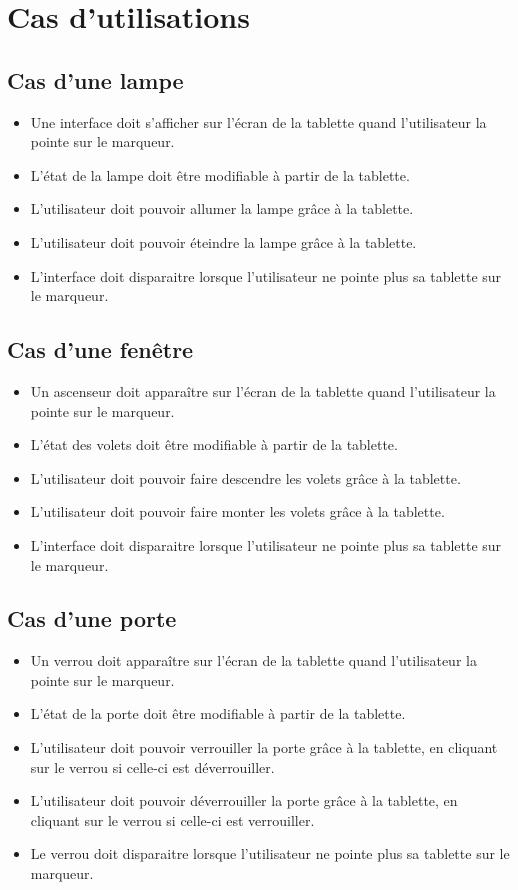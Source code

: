 \documentclass[12pt,a4paper]{article}
\begin{document}
\section{Cas d'utilisations}
\subsection{Cas d'une lampe}

\begin{itemize}
  \item Une interface doit s'afficher sur l'écran de la tablette quand l'utilisateur la pointe sur le marqueur.
  \item L'état de la lampe doit être modifiable à partir de la tablette.
  \item L'utilisateur doit pouvoir allumer la lampe grâce à la tablette.
  \item L'utilisateur doit pouvoir éteindre la lampe grâce à la tablette.
  \item L'interface doit disparaitre lorsque l'utilisateur ne pointe plus sa tablette sur le marqueur.
\end{itemize}

\subsection{Cas d'une fenêtre}
\begin{itemize} 
  \item Un ascenseur doit apparaître sur l'écran de la tablette quand l'utilisateur la pointe sur le marqueur.
  \item L'état des volets doit être modifiable à partir de la tablette.
  \item L'utilisateur doit pouvoir faire descendre les volets grâce à la tablette.
  \item L'utilisateur doit pouvoir faire monter les volets grâce à la tablette.
  \item L'interface doit disparaitre lorsque l'utilisateur ne pointe plus sa tablette sur le marqueur.
\end{itemize}

\subsection{Cas d'une porte}
\begin{itemize} 
  \item Un verrou doit apparaître sur l'écran de la tablette quand l'utilisateur la pointe sur le marqueur.
  \item L'état de la porte doit être modifiable à partir de la tablette.
  \item L'utilisateur doit pouvoir verrouiller la porte grâce à la tablette, en cliquant sur le verrou si celle-ci est déverrouiller.
  \item L'utilisateur doit pouvoir déverrouiller la porte grâce à la tablette, en cliquant sur le verrou si celle-ci est verrouiller.
  \item Le verrou doit disparaitre lorsque l'utilisateur ne pointe plus sa tablette sur le marqueur.
\end{itemize}
\end{document}
